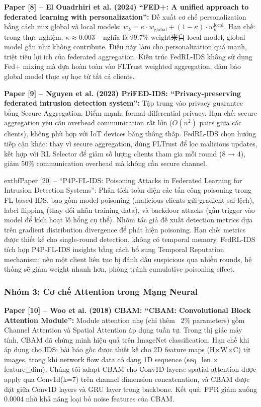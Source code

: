 \documentclass[12pt,a4paper]{article}
\begin{document}
\textbf{Paper [8] -- El Ouadrhiri et al. (2024) ``FED+: A unified approach to federated learning with personalization'': } Đề xuất cơ chế personalization bằng cách mix global và local models: $w_k = \kappa \cdot w_{\text{global}} + (1-\kappa) \cdot w_k^{\text{local}}$. Hạn chế: trong thực nghiệm, $\kappa \approx 0.003$ -- nghĩa là 99.7\% weight来自 local model, global model gần như không contribute. Điều này làm cho personalization quá mạnh, triệt tiêu lợi ích của federated aggregation. Kiến trúc FedRL-IDS không sử dụng Fed+ mixing mà dựa hoàn toàn vào FLTrust weighted aggregation, đảm bảo global model thực sự học từ tất cả clients.

\textbf{Paper [9] -- Nguyen et al. (2023) PriFED-IDS: ``Privacy-preserving federated intrusion detection system'': } Tập trung vào privacy guarantee bằng Secure Aggregation. Điểm mạnh: formal differential privacy. Hạn chế: secure aggregation yêu cầu overhead communication rất lớn ($O(n^2)$ pairs giữa các clients), không phù hợp với IoT devices băng thông thấp. FedRL-IDS chọn hướng tiếp cận khác: thay vì secure aggregation, dùng FLTrust để lọc malicious updates, kết hợp với RL Selector để giảm số lượng clients tham gia mỗi round (8 → 4), giảm 50\% communication overhead mà không cần secure channel.

	extbf{Paper [20] -- ``P4P-FL-IDS: Poisoning Attacks in Federated Learning for Intrusion Detection Systems'': } Phân tích toàn diện các tấn công poisoning trong FL-based IDS, bao gồm model poisoning (malicious clients gửi gradient sai lệch), label flipping (thay đổi nhãn training data), và backdoor attacks (gắn trigger vào model để kích hoạt lỗ hổng cụ thể). Nhóm tác giả đề xuất detection metrics dựa trên gradient distribution divergence để phát hiện poisoning. Hạn chế: metrics được thiết kế cho single-round detection, không có temporal memory. FedRL-IDS tích hợp P4P-FL-IDS insights bằng cách bổ sung Temporal Reputation mechanism: nếu một client liên tục bị đánh dấu suspicious qua nhiều rounds, hệ thống sẽ giảm weight nhanh hơn, phòng tránh cumulative poisoning effect.

\subsubsection{Nhóm 3: Cơ chế Attention trong Mạng Neural}

\textbf{Paper [10] -- Woo et al. (2018) CBAM: ``CBAM: Convolutional Block Attention Module'': } Module attention nhẹ (chỉ thêm ~2\% parameters) gồm Channel Attention và Spatial Attention áp dụng tuần tự. Trong thị giác máy tính, CBAM đã chứng minh hiệu quả trên ImageNet classification. Hạn chế khi áp dụng cho IDS: bài báo gốc được thiết kế cho 2D feature maps (H×W×C) từ images, trong khi network flow data có dạng 1D sequence (seq\_len × feature\_dim). Chúng tôi adapt CBAM cho Conv1D layers: spatial attention được apply qua Conv1d(k=7) trên channel dimension concatenation, và CBAM được đặt giữa Conv1D layers và GRU layer trong backbone. Kết quả: FPR giảm xuống 0.0004 nhờ khả năng loại bỏ noise features của CBAM.
\end{document}
